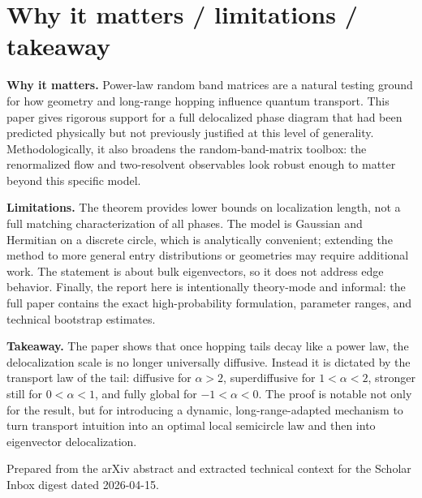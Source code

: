 \documentclass[11pt]{article}
\begin{document}
\section*{Why it matters / limitations / takeaway}
\textbf{Why it matters.} Power-law random band matrices are a natural testing ground for how geometry and long-range hopping influence quantum transport. This paper gives rigorous support for a full delocalized phase diagram that had been predicted physically but not previously justified at this level of generality. Methodologically, it also broadens the random-band-matrix toolbox: the renormalized flow and two-resolvent observables look robust enough to matter beyond this specific model.

\textbf{Limitations.} The theorem provides lower bounds on localization length, not a full matching characterization of all phases. The model is Gaussian and Hermitian on a discrete circle, which is analytically convenient; extending the method to more general entry distributions or geometries may require additional work. The statement is about bulk eigenvectors, so it does not address edge behavior. Finally, the report here is intentionally theory-mode and informal: the full paper contains the exact high-probability formulation, parameter ranges, and technical bootstrap estimates.

\textbf{Takeaway.} The paper shows that once hopping tails decay like a power law, the delocalization scale is no longer universally diffusive. Instead it is dictated by the transport law of the tail: diffusive for $\alpha>2$, superdiffusive for $1<\alpha<2$, stronger still for $0<\alpha<1$, and fully global for $-1<\alpha<0$. The proof is notable not only for the result, but for introducing a dynamic, long-range-adapted mechanism to turn transport intuition into an optimal local semicircle law and then into eigenvector delocalization.

\vfill
{\small Prepared from the arXiv abstract and extracted technical context for the Scholar Inbox digest dated 2026-04-15.}
\end{document}
